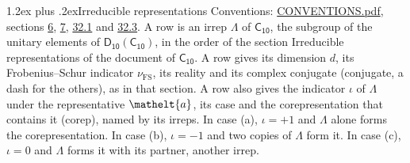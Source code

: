 \documentclass[10pt,a4paper]{article}
\makeatletter
\renewcommand\section{\@startsection{section}{1}{\z@}{-3ex plus -1ex minus -.2ex}%
  {1.2ex plus .2ex}{\normalfont\large\sffamily\bfseries\color{parttitle}}}
\numberwithin{equation}{section}
\newcommand{\eltfont}[1]{{\let\sigma\eltsigma\mathelt{#1}}}
\newcommand{\grp}[1]{\mathsf{#1}}
\newcommand{\elt}[1]{\eltfont{#1}}
\newcommand{\fsind}{\nu_{\mathrm{FS}}}
\makeatother
\begin{document}
\section{Irreducible representations}\label{s:irreps}
Conventions: \href{../../CONVENTIONS.pdf}{CONVENTIONS.pdf}, sections \href{../../../rotation/CONVENTIONS.pdf\#conv.6}{6}, \href{../../../rotation/CONVENTIONS.pdf\#conv.7}{7}, \href{../../CONVENTIONS.pdf\#conv.32.1}{32.1} and \href{../../CONVENTIONS.pdf\#conv.32.3}{32.3}.
\leavevmode\label{n:irrep.Delta}A row is an irrep $\Lambda$ of $\grp{C_{10}}$, the subgroup of the unitary elements of $\grp{D_{10}}(\grp{C_{10}})$, in the order of the section Irreducible representations of the document of \href{../../../rotation/data/pdf/C10.pdf}{$\grp{C_{10}}$}. \label{n:index.dimension}\label{n:index.frobenius}\label{n:head.irrep}\label{n:head.reality}\label{n:head.conjugate}A row gives its dimension $d$, its Frobenius--Schur indicator $\fsind$, its reality and its complex conjugate (conjugate, a dash for the others), as in that section. \label{n:head.case.corep}\label{n:head.corep}A row also gives the indicator $\iota$ of $\Lambda$ under the representative $\elt{a}$, its case and the corepresentation that contains it (corep), named by its irreps. In case (a), $\iota = +1$ and $\Lambda$ alone forms the corepresentation. In case (b), $\iota = -1$ and two copies of $\Lambda$ form it. In case (c), $\iota = 0$ and $\Lambda$ forms it with its partner, another irrep.
\setlength{\emergencystretch}{2em}\par\setlength{\emergencystretch}{0pt}
\end{document}
